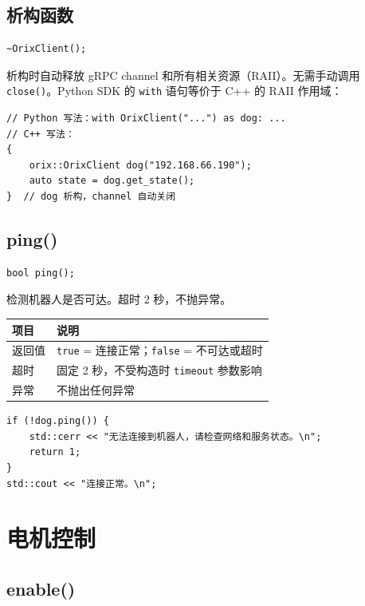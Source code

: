 \documentclass[a4paper,11pt,openany]{book}
\begin{document}
\subsection{析构函数}

\begin{lstlisting}[style=cpp,numbers=none]
~OrixClient();
\end{lstlisting}

析构时自动释放 gRPC channel 和所有相关资源（RAII）。无需手动调用 \texttt{close()}。Python SDK 的 \texttt{with} 语句等价于 C++ 的 RAII 作用域：

\begin{lstlisting}[style=cpp]
// Python 写法：with OrixClient("...") as dog: ...
// C++ 写法：
{
    orix::OrixClient dog("192.168.66.190");
    auto state = dog.get_state();
}  // dog 析构，channel 自动关闭
\end{lstlisting}

\subsection{ping()}

\begin{lstlisting}[style=cpp,numbers=none]
bool ping();
\end{lstlisting}

检测机器人是否可达。超时 2 秒，不抛异常。

\begin{longtable}{ll}
\toprule
项目 & 说明 \\
\midrule
\endhead
返回值 & \texttt{true} = 连接正常；\texttt{false} = 不可达或超时 \\
超时 & 固定 2 秒，不受构造时 \texttt{timeout} 参数影响 \\
异常 & 不抛出任何异常 \\
\bottomrule
\end{longtable}

\begin{lstlisting}[style=cpp]
if (!dog.ping()) {
    std::cerr << "无法连接到机器人，请检查网络和服务状态。\n";
    return 1;
}
std::cout << "连接正常。\n";
\end{lstlisting}

\section{电机控制}

\subsection{enable()}
\end{document}

